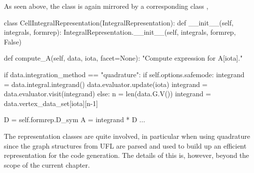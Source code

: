 As seen above, the  class is again mirrored by a corresponding class , 
\begin{python}
class CellIntegralRepresentation(IntegralRepresentation):
    def __init__(self, integrals, formrep):
        IntegralRepresentation.__init__(self, integrals, formrep, False)
    
    def compute_A(self, data, iota, facet=None):
        "Compute expression for A[iota]."
        
        if data.integration_method == "quadrature":
            if self.options.safemode:
                integrand = data.integral.integrand()
                data.evaluator.update(iota)
                integrand = data.evaluator.visit(integrand)
            else:
                n = len(data.G.V())
                integrand = data.vertex_data_set[iota][n-1]
            
            D = self.formrep.D_sym
            A = integrand * D
            ...     
\end{python}
The representation classes are quite involved, in particular when using quadrature since
the graph structures from UFL are parsed and used to build up an efficient representation 
for the code generation. The details of this is, however, beyond the scope of the current chapter.  



%
%
%


